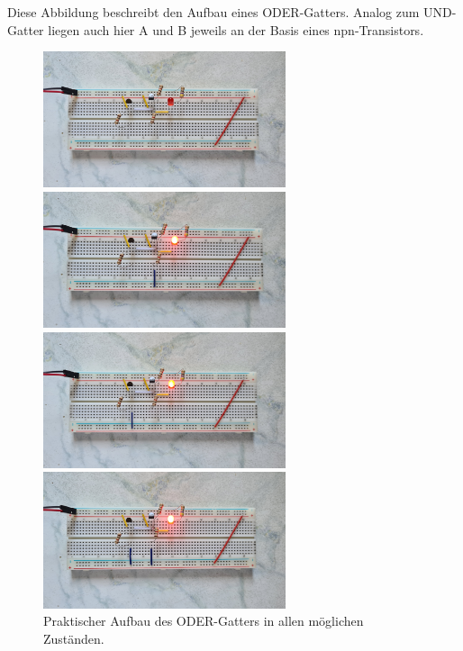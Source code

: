 Diese Abbildung beschreibt den Aufbau eines ODER-Gatters. Analog zum UND-Gatter liegen auch hier A und B jeweils an der Basis eines npn-Transistors.
\begin{figure}[h!]
	\begin{minipage}{.5\textwidth}
		\centering
		\includegraphics[height=4cm, keepaspectratio]{./Fotos/ODER-00.jpg}
		\vspace{1cm}
	\end{minipage}%
	\begin{minipage}{.5\textwidth}
		\centering
		\includegraphics[height=4cm, keepaspectratio]{./Fotos/ODER-01.jpg}
		\vspace{1cm}
	\end{minipage}
	\begin{minipage}{.5\textwidth}
		\centering
		\includegraphics[height=4cm, keepaspectratio]{./Fotos/ODER-10.jpg}
	\end{minipage}%
	\begin{minipage}{.5\textwidth}
		\centering
		\includegraphics[height=4cm, keepaspectratio]{./Fotos/ODER-11.jpg}
	\end{minipage}
	\caption{Praktischer Aufbau des ODER-Gatters in allen möglichen Zuständen.}
\end{figure}
\newpage

